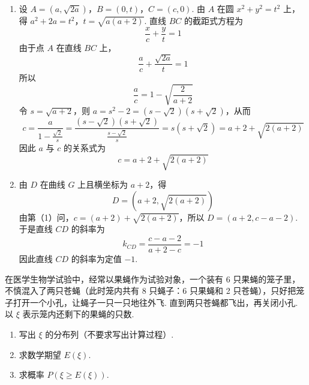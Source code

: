 \begin{solution}
\begin{enumerate}
\item 设 \(A=(a,\sqrt{2a})\)，\(B=(0,t)\)，\(C=(c,0)\). 由 \(A\) 在圆 \(x^2+y^2=t^2\) 上，得
\(a^2+2a=t^2\)，\(t=\sqrt{a(a+2)}\).
直线 \(BC\) 的截距式方程为
\[
\frac{x}{c}+\frac{y}{t}=1
\]
由于点 \(A\) 在直线 \(BC\) 上，
\[
\frac{a}{c}+\frac{\sqrt{2a}}{t}=1
\]
所以
\[
\frac{a}{c}=1-\sqrt{\frac{2}{a+2}}
\]
令 \(s=\sqrt{a+2}\)，则 \(a=s^2-2=(s-\sqrt2)(s+\sqrt2)\)，从而
\[
c=\frac{a}{1-\frac{\sqrt2}{s}}
=\frac{(s-\sqrt2)(s+\sqrt2)}{\frac{s-\sqrt2}{s}}
=s(s+\sqrt2)
=a+2+\sqrt{2(a+2)}
\]
因此 \(a\) 与 \(c\) 的关系式为
\[
c=a+2+\sqrt{2(a+2)}
\]

\item 由 \(D\) 在曲线 \(G\) 上且横坐标为 \(a+2\)，得
\[
D=\left(a+2,\sqrt{2(a+2)}\right)
\]
由第（1）问，\(c=(a+2)+\sqrt{2(a+2)}\)，所以 \(D=(a+2,c-a-2)\). 于是直线 \(CD\) 的斜率为
\[
k_{CD}=\frac{c-a-2}{a+2-c}=-1
\]
因此直线 \(CD\) 的斜率为定值 \(-1\).
\end{enumerate}
\end{solution}

\begin{problem}
在医学生物学试验中，经常以果蝇作为试验对象，一个装有 6 只果蝇的笼子里，不慎混入了两只苍蝇（此时笼内共有 8 只蝇子：6 只果蝇和 2 只苍蝇），只好把笼子打开一个小孔，让蝇子一只一只地往外飞. 直到两只苍蝇都飞出，再关闭小孔. 以 \(\xi\) 表示笼内还剩下的果蝇的只数.

\begin{enumerate}
\item 写出 \(\xi\) 的分布列（不要求写出计算过程）.
\item 求数学期望 \(E(\xi)\).
\item 求概率 \( P(\xi \geqslant E(\xi)) \).
\end{enumerate}
\end{problem}

